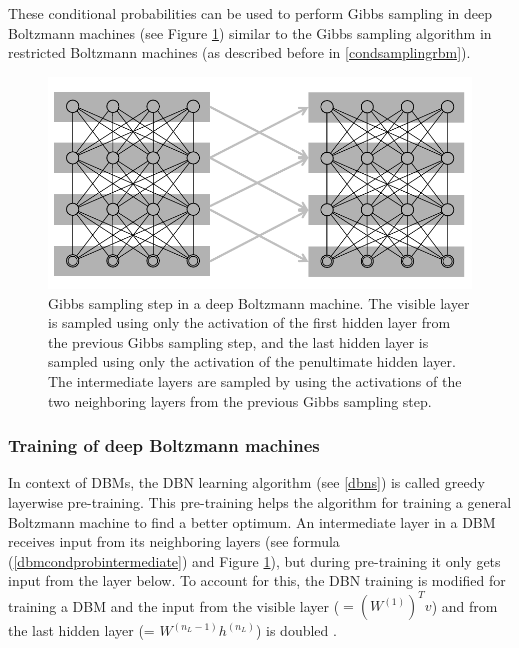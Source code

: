 \documentclass[12pt]{article}
\begin{document}
These conditional probabilities can be used to perform Gibbs sampling in deep Boltzmann machines (see Figure \ref{fig:dbmsampling}) similar to the Gibbs sampling algorithm in restricted Boltzmann machines (as described before in \ref{condsamplingrbm}).

\begin{figure}[h]
   \centering
   \includegraphics[scale=1.0]{images/dbmsampling.pdf}
   \caption{Gibbs sampling step in a deep Boltzmann machine. The visible layer is sampled using only the activation of the first hidden layer from the previous Gibbs sampling step, and the last hidden layer is sampled using only the activation of the penultimate hidden layer. The intermediate layers are sampled by using the activations of the two neighboring layers from the previous Gibbs sampling step. }
   \label{fig:dbmsampling}
 \end{figure}


\subsubsection{Training of deep Boltzmann machines}\label{dbmtraining}


In context of DBMs, the DBN learning algorithm (see \ref{dbns}) is called greedy layerwise pre-training.
This pre-training helps the algorithm for training a general Boltzmann machine to find a better optimum.
An intermediate layer in a DBM receives input from its neighboring layers (see formula (\ref{dbmcondprobintermediate}) and Figure \ref{fig:dbmsampling}), but during pre-training it only gets input from the layer below. To account for this, the DBN training is modified for training a DBM and the input from the visible layer ($ = (W^{(1)})^T v$) and from the last hidden layer (= $W^{(n_L-1)} h^{(n_L)}$) is doubled
\citep{salakhutdinov2009DBMs}.
\end{document}
